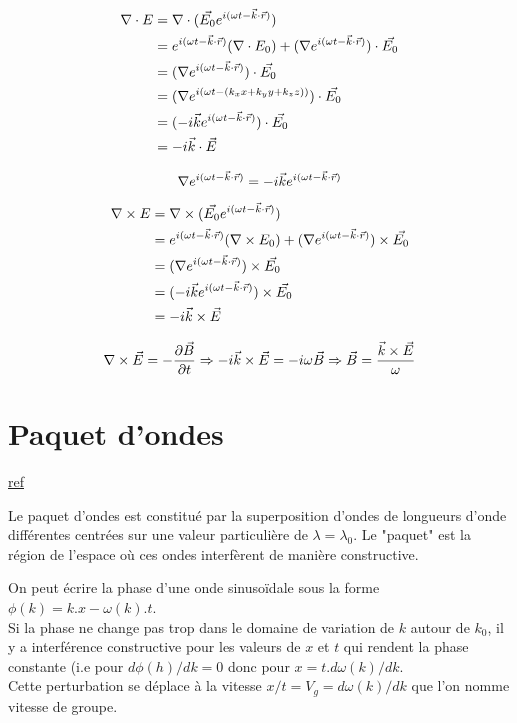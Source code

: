 \documentclass{article}
\begin{document}
$$
\begin{aligned}
\nabla \cdot E 
& = \nabla \cdot (\vec{E_0} e^{i(\omega t - \vec{k}\cdot \vec{r})}) \\
& = e^{i(\omega t - \vec{k}\cdot \vec{r})} (\nabla \cdot E_0) + (\nabla e^{i(\omega t - \vec{k}\cdot \vec{r})}) \cdot \vec{E_0}\\
& = (\nabla e^{i(\omega t - \vec{k}\cdot \vec{r})}) \cdot \vec{E_0}\\
& = (\nabla e^{i(\omega t - (k_x x + k_y y + k_z z))}) \cdot \vec{E_0}\\
& = (-i\vec{k}{e^{i(\omega t - \vec{k}\cdot \vec{r})}}) \cdot \vec{E_0}\\
& = -i\vec{k}\cdot \vec{E}
\end{aligned}
$$

$$
\nabla e^{i(\omega t - \vec{k} \cdot \vec{r})}
= -i\vec{k}{e^{i(\omega t - \vec{k}\cdot \vec{r})}}
$$

$$
\begin{aligned}
\nabla \times E 
& = \nabla \times (\vec{E_0} e^{i(\omega t - \vec{k}\cdot \vec{r})}) \\
& = e^{i(\omega t - \vec{k}\cdot \vec{r})} (\nabla \times E_0) + (\nabla e^{i(\omega t - \vec{k}\cdot \vec{r})}) \times \vec{E_0}\\
& = (\nabla e^{i(\omega t - \vec{k}\cdot \vec{r})}) \times \vec{E_0}\\
& = (-i\vec{k}{e^{i(\omega t - \vec{k}\cdot \vec{r})}}) \times \vec{E_0}\\
& = -i\vec{k}\times \vec{E}
\end{aligned}
$$

$$
\nabla \times \vec{E} = - \dfrac{\partial \vec{B}}{\partial t}
\Rightarrow
-i\vec{k} \times \vec{E} = -i \omega \vec{B}
\Rightarrow
\vec{B} = \dfrac{\vec{k} \times \vec{E}}{\omega}
$$

\section{Paquet d'ondes}
\href{http://ressources.univ-lemans.fr/AccesLibre/UM/Pedago/physique/02/divers/paquet2.html}{ref}

Le paquet d'ondes est constitu\'e par la superposition d'ondes de longueurs d'onde diff\'erentes centr\'ees sur une valeur particuli\`ere de $\lambda = \lambda_0$. Le "paquet" est la r\'egion de l'espace o\`u ces ondes interf\`erent de mani\`ere constructive.

On peut \'ecrire la phase d'une onde sinuso\"idale sous la forme $\phi(k) = k.x - \omega(k).t$.\\
Si la phase ne change pas trop dans le domaine de variation de $k$ autour de $k_0$, il y a interf\'erence constructive pour les valeurs de $x$ et $t$ qui rendent la phase constante (i.e pour $d\phi(h) / dk = 0$ donc pour $x = t.d\omega(k) / dk$.\\
Cette perturbation se d\'eplace \`a la vitesse $x / t  = V_g = d\omega(k) / dk$ que l'on nomme vitesse de groupe.
\end{document}
